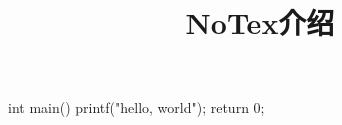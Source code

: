 \documentclass{NoTex}
\begin{document}
\title{NoTex介绍}
\maketitle

\begin{cppcode}
int main() {
  printf("hello, world\n");
  return 0;
}
\end{cppcode}
\end{document}
